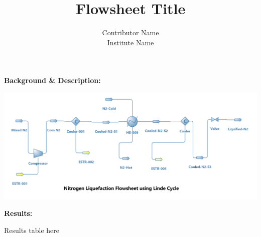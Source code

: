 \documentclass[a4paper,12pt]{article}
\title{Flowsheet Title} %
\author{Contributor Name \\ Institute Name} %
\date{}
\begin{document}
\maketitle

\noindent \textbf{Background \& Description:} 
\newline

\vspace{15mm}
\centerline{\includegraphics[width=1.2\linewidth]{flowsheet-image.png}}

\newpage
\noindent \textbf{Results:}

Results table here
\end{document}
